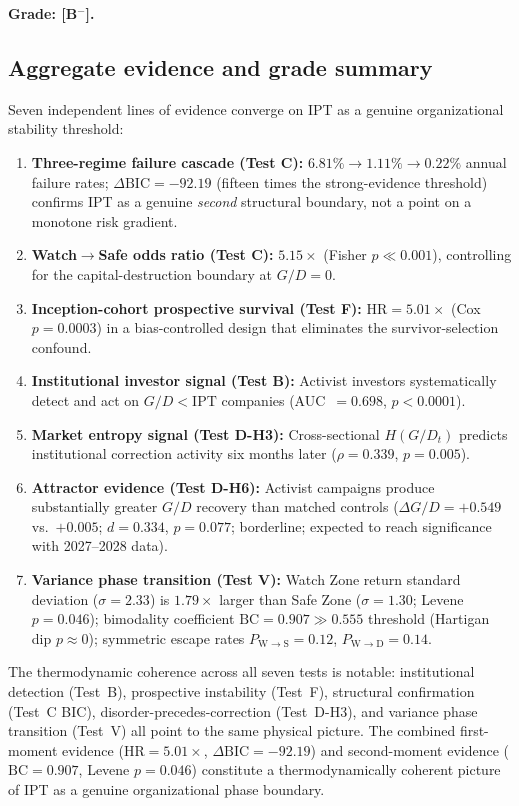 \documentclass[11pt]{article}
\theoremstyle{remark}
\newcommand{\IPT}{\mathrm{IPT}}
\begin{document}
\textbf{Grade: [B$^-$].}

\subsection{Aggregate evidence and grade summary}
\label{sec:org:grade}

Seven independent lines of evidence converge on IPT as a genuine organizational stability threshold:
\begin{enumerate}[leftmargin=2em,itemsep=3pt]
  \item \textbf{Three-regime failure cascade (Test C):}
        $6.81\% \to 1.11\% \to 0.22\%$ annual failure rates;
        $\Delta\mathrm{BIC} = -92.19$ (fifteen times the strong-evidence threshold)
        confirms IPT as a genuine \emph{second} structural boundary, not a point on
        a monotone risk gradient.
  \item \textbf{Watch$\to$Safe odds ratio (Test C):}
        $5.15\times$ (Fisher $p \ll 0.001$), controlling for the capital-destruction
        boundary at $G/D = 0$.
  \item \textbf{Inception-cohort prospective survival (Test F):}
        $\mathrm{HR} = 5.01\times$ (Cox $p = 0.0003$) in a bias-controlled design
        that eliminates the survivor-selection confound.
  \item \textbf{Institutional investor signal (Test B):}
        Activist investors systematically detect and act on $G/D < \IPT$ companies
        (AUC~$= 0.698$, $p < 0.0001$).
  \item \textbf{Market entropy signal (Test D-H3):}
        Cross-sectional $H(G/D_t)$ predicts institutional correction activity
        six months later ($\rho = 0.339$, $p = 0.005$).
  \item \textbf{Attractor evidence (Test D-H6):}
        Activist campaigns produce substantially greater $G/D$ recovery than
        matched controls ($\Delta G/D = +0.549$ vs.\ $+0.005$; $d = 0.334$,
        $p = 0.077$; borderline; expected to reach significance with 2027--2028 data).
  \item \textbf{Variance phase transition (Test V):}
        Watch Zone return standard deviation ($\sigma = 2.33$) is $1.79\times$ larger
        than Safe Zone ($\sigma = 1.30$; Levene $p = 0.046$); bimodality coefficient
        $\mathrm{BC} = 0.907 \gg 0.555$ threshold (Hartigan dip $p \approx 0$);
        symmetric escape rates $P_{\mathrm{W \to S}} = 0.12$, $P_{\mathrm{W \to D}} = 0.14$.
\end{enumerate}
The thermodynamic coherence across all seven tests is notable:
institutional detection (Test~B), prospective instability (Test~F),
structural confirmation (Test~C BIC), disorder-precedes-correction (Test~D-H3),
and variance phase transition (Test~V) all point to the same physical picture.
The combined first-moment evidence ($\mathrm{HR} = 5.01\times$, $\Delta\mathrm{BIC} = -92.19$)
and second-moment evidence ($\mathrm{BC} = 0.907$, Levene $p = 0.046$) constitute a
thermodynamically coherent picture of IPT as a genuine organizational phase boundary.
\end{document}

